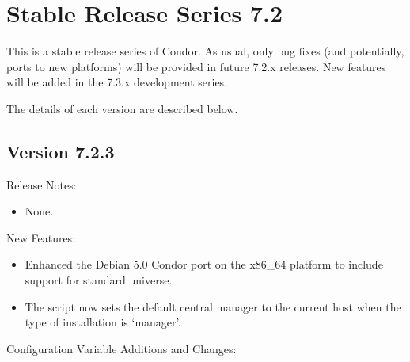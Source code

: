 
\section{\label{sec:History-7-2}Stable Release Series 7.2}

This is a stable release series of Condor.
As usual, only bug fixes (and potentially, ports to new platforms)
will be provided in future 7.2.x releases.
New features will be added in the 7.3.x development series.

The details of each version are described below.

\subsection*{\label{sec:New-7-2-3}Version 7.2.3}

\noindent Release Notes:

\begin{itemize}

\item None.

\end{itemize}


\noindent New Features:

\begin{itemize}

\item Enhanced the Debian 5.0 Condor port on the x86\_64 platform to 
include support for standard universe. 

\item The  script now sets the default central manager
to the current host when the type of installation is `manager'.

\end{itemize}

\noindent Configuration Variable Additions and Changes:

